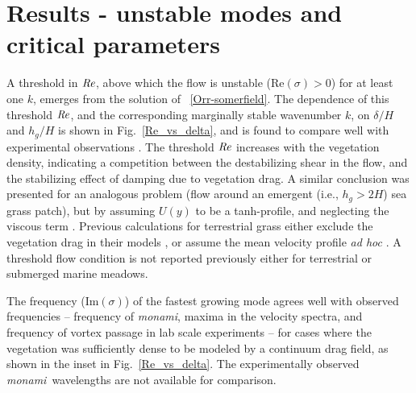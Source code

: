 \documentclass{jfm}
\newcommand{\hg}{h_g}
\newcommand{\monami}{\textit{monami}}
\begin{document}
\section{Results - unstable modes and critical parameters}
A threshold in $\mbox{\textit{Re}}$, above which the flow is unstable (Re$(\sigma)>0$) for at least one $k$, emerges from the solution of ~\eqref{Orr-somerfield}. 
The dependence of this threshold $\mbox{\textit{Re}}$, and the corresponding marginally stable wavenumber $k$, on $\delta/H$ and $\hg/H$ is shown in Fig.~\ref{Re_vs_delta}, and is found to compare well with experimental observations \cite{Ghisal02}.
The threshold $\mbox{\textit{Re}}$ increases with the vegetation density, indicating a competition between the destabilizing shear in the flow, and the stabilizing effect of damping due to vegetation drag.
A similar conclusion was presented for an analogous problem (flow around an emergent (i.e., $\hg>2H$) sea grass patch), but by assuming $U(y)$ to be a tanh-profile, and neglecting the viscous term \cite{White07}.
Previous calculations for terrestrial grass either exclude the vegetation drag in their models \cite{Raupach96}, or assume the mean velocity profile \textit{ad hoc} \cite{Raupach96,Delangre06}.
A threshold flow condition is not reported previously either for terrestrial or submerged marine meadows.

The frequency (Im$(\sigma)$) of the fastest growing mode agrees well with observed frequencies -- frequency of \monami, maxima in the velocity spectra, and frequency of vortex passage in lab scale experiments \cite{Ghisal02} -- for cases where the vegetation was sufficiently dense to be modeled by a continuum drag field, as shown in the inset in Fig.~\ref{Re_vs_delta}. 
The experimentally observed \monami ~wavelengths are not available for comparison.
\end{document}
